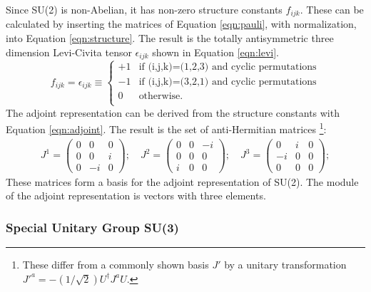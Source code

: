 Since SU(2) is non-Abelian, it has non-zero structure constants $f_{ijk}$. 
These can be calculated by inserting the matrices of Equation \ref{eqn:pauli}, with normalization, into Equation \ref{eqn:structure}.
The result is the totally antisymmetric three dimension Levi-Civita tensor $\epsilon_{ijk}$ shown in Equation \ref{eqn:levi}.
\begin{equation}\label{eqn:levi}
f_{ijk} = \epsilon_{ijk} \equiv \begin{cases}
+1 &\text{if (i,j,k)=(1,2,3) and cyclic permutations}\\
-1 &\text{if (i,j,k)=(3,2,1) and cyclic permutations}\\
0 &\text{otherwise.}\\
\end{cases}
\end{equation} 
The adjoint representation can be derived from the structure constants with Equation \ref{eqn:adjoint}.
The result is the set of anti-Hermitian matrices \footnote{These differ from a commonly shown basis $J'$ by a unitary transformation $J'^a=-(1/\sqrt{2})U^\dagger J^aU$.}:
\begin{equation}\begin{split}
J^1 = \begin{pmatrix}0&0&0\\0&0&i\\0&-i&0\end{pmatrix} ; \quad
J^2 = \begin{pmatrix}0&0&-i\\0&0&0\\i&0&0\end{pmatrix} ; \quad
J^3 = \begin{pmatrix}0&i&0\\-i&0&0\\0&0&0\end{pmatrix} ;
\end{split}\end{equation}
These matrices form a basis for the adjoint representation of SU(2).
The module of the adjoint representation is vectors with three elements.

\subsubsection{Special Unitary Group SU(3)}

